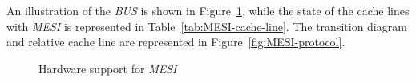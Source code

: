 \documentclass[english]{article}
\begin{document}
\bigskip
An illustration of the \textit{BUS} is shown in Figure~\ref{subfig:MESI-bus-rd}, while the state of the cache lines with \textit{MESI} is represented in Table~\ref{tab:MESI-cache-line}.
The transition diagram and relative cache line are represented in Figure~\ref{fig:MESI-protocol}.

\begin{figure}[htbp]
  \centering
  \bigskip
  \caption{Hardware support for \textit{MESI}}
  \label{subfig:MESI-bus-rd}
  \bigskip
\end{figure}

\begin{table}[htbp]
  \centering
  \caption{State of cache lines with \textit{MESI} Protocol}
  \label{tab:MESI-cache-line}
\end{table}
\end{document}
